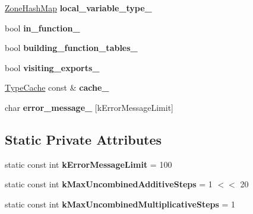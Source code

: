 \begin{DoxyCompactItemize}
\item 
\hyperlink{classv8_1_1internal_1_1_template_hash_map_impl}{Zone\+Hash\+Map} {\bfseries local\+\_\+variable\+\_\+type\+\_\+}\hypertarget{classv8_1_1internal_1_1_asm_typer_ad0d6680d45cfbc1485f090adea3411ae}{}\label{classv8_1_1internal_1_1_asm_typer_ad0d6680d45cfbc1485f090adea3411ae}

\item 
bool {\bfseries in\+\_\+function\+\_\+}\hypertarget{classv8_1_1internal_1_1_asm_typer_aa493458117efb01e24cd7de9eba195a8}{}\label{classv8_1_1internal_1_1_asm_typer_aa493458117efb01e24cd7de9eba195a8}

\item 
bool {\bfseries building\+\_\+function\+\_\+tables\+\_\+}\hypertarget{classv8_1_1internal_1_1_asm_typer_af1b575d3bc0b1784d0fcb478130c7828}{}\label{classv8_1_1internal_1_1_asm_typer_af1b575d3bc0b1784d0fcb478130c7828}

\item 
bool {\bfseries visiting\+\_\+exports\+\_\+}\hypertarget{classv8_1_1internal_1_1_asm_typer_a7f446071c08ed052af6f5ed3093ccac2}{}\label{classv8_1_1internal_1_1_asm_typer_a7f446071c08ed052af6f5ed3093ccac2}

\item 
\hyperlink{classv8_1_1internal_1_1_type_cache}{Type\+Cache} const \& {\bfseries cache\+\_\+}\hypertarget{classv8_1_1internal_1_1_asm_typer_a21c698af59c067883b7fc163766854a5}{}\label{classv8_1_1internal_1_1_asm_typer_a21c698af59c067883b7fc163766854a5}

\item 
char {\bfseries error\+\_\+message\+\_\+} \mbox{[}k\+Error\+Message\+Limit\mbox{]}\hypertarget{classv8_1_1internal_1_1_asm_typer_ae7dcf276fbd51b5f9374f505fb265899}{}\label{classv8_1_1internal_1_1_asm_typer_ae7dcf276fbd51b5f9374f505fb265899}

\end{DoxyCompactItemize}
\subsection*{Static Private Attributes}
\begin{DoxyCompactItemize}
\item 
static const int {\bfseries k\+Error\+Message\+Limit} = 100\hypertarget{classv8_1_1internal_1_1_asm_typer_a8927fde3993f920db0176aa091709b8d}{}\label{classv8_1_1internal_1_1_asm_typer_a8927fde3993f920db0176aa091709b8d}

\item 
static const int {\bfseries k\+Max\+Uncombined\+Additive\+Steps} = 1 $<$$<$ 20\hypertarget{classv8_1_1internal_1_1_asm_typer_a21f79e75af8154f9a43b4ef1350f2047}{}\label{classv8_1_1internal_1_1_asm_typer_a21f79e75af8154f9a43b4ef1350f2047}

\item 
static const int {\bfseries k\+Max\+Uncombined\+Multiplicative\+Steps} = 1\hypertarget{classv8_1_1internal_1_1_asm_typer_a2290d1c6eb84aeb78570ec647b70f771}{}\label{classv8_1_1internal_1_1_asm_typer_a2290d1c6eb84aeb78570ec647b70f771}

\end{DoxyCompactItemize}


